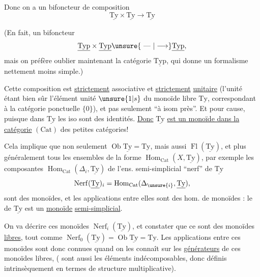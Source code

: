Donc on a un bifoncteur de composition
\[
\underline{\mathrm{Ty}}\times\underline{\mathrm{Ty}}\longrightarrow\underline{\mathrm{Ty}}
\]

(En fait,  un bifoncteur 
\[
\underline{\mathrm{Typ}}\times\underline{\mathrm{Typ}}\unsure{\text{ --- }|\longrightarrow}\underline{\mathrm{Typ}},
\]
mais on préfère oublier maintenant la catégorie $\underline{\mathrm{Typ}}$, qui donne un formalisme nettement moins simple.)

Cette composition est \uline{strictement} associative et \uline{strictement} \uline{unitaire} (l'unité étant bien sûr l'élément unité $\unsure{1|s}$ du monoïde libre $\mathrm{Ty}$, correspondant à la catégorie ponctuelle $\{0\}$), et pas seulement ``à isom près''. Et pour cause, puisque dans $\underline{\mathrm{Ty}}$ les  iso sont des identités. \uline{Donc} $\underline{\mathrm{Ty}}$ \uline{est un monoïde dans la catégorie} $(\mathrm{Cat})$ des petites catégories!


Cela implique que non seulement $\operatorname{Ob}\underline{\mathrm{Ty}}=\mathrm{Ty}$, mais aussi $\operatorname{Fl}(\underline{\mathrm{Ty}})$, et plus généralement tous les ensembles  de la forme $\operatorname{Hom}_{\mathrm{Cat}}(X,\underline{\mathrm{Ty}})$,  par exemple les composantes $\operatorname{Hom}_{\mathrm{Cat}}(\Delta_i,\underline{\mathrm{Ty}})$ de l'ens. semi-simplicial ``nerf'' de $\underline{\mathrm{Ty}}$
\[
\operatorname{Nerf}(\underline{\mathrm{Ty}})_i=\operatorname{Hom}_{\mathrm{Cat}}(\Delta_{\unsure{i}},\underline{\mathrm{Ty}}),
\]
sont des monoïdes, et les applications  entre elles sont des hom. de monoïdes : le   de $\underline{\mathrm{Ty}}$ est un \uline{monoïde} \uline{semi-simplicial}.

On va décrire ces monoïdes $\operatorname{Nerf}_i(\underline{\mathrm{Ty}})$, et constater que ce sont  des monoïdes \uline{libres},   tout comme $\operatorname{Nerf}_0(\underline{\mathrm{Ty}})=\operatorname{Ob}\underline{\mathrm{Ty}}=\mathrm{Ty}$. Les applications  entre ces monoïdes sont donc connues quand on les connaît sur les \uline{générateurs} de ces monoïdes libres, ( sont aussi les éléments indécomposables, donc définis intrinsèquement en termes de  structure multiplicative).

